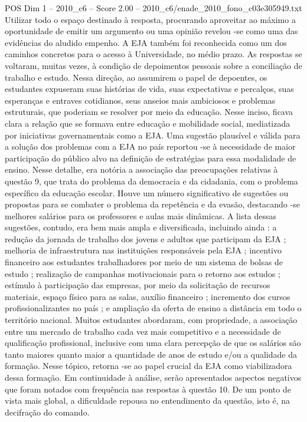 \begin{textsample}{POS Dim 1 – 2010\_c6 – Score 2.00 – 2010\_c6/enade\_2010\_fono\_c03e305949.txt}
Utilizar todo o espaço destinado à resposta, procurando aproveitar ao máximo a oportunidade de emitir um argumento ou uma opinião revelou -se como uma das evidências do aludido empenho.
A EJA também foi reconhecida como um dos caminhos concretos para o acesso à Universidade, no médio prazo.
As respostas se voltaram, muitas vezes, à condição de depoimentos pessoais sobre a conciliação de trabalho e estudo.
Nessa direção, ao assumirem o papel de depoentes, os estudantes expuseram suas histórias de vida, suas expectativas e percalços, suas esperanças e entraves cotidianos, seus anseios mais ambiciosos e problemas estruturais, que poderiam se resolver por meio da educação.
Nesse inciso, ficava clara a relação que se formava entre educação e mobilidade social, mediatizada por iniciativas governamentais como a EJA.
Uma sugestão plausível e válida para a solução dos problemas com a EJA no país reportou -se à necessidade de maior participação do público alvo na definição de estratégias para essa modalidade de ensino.
Nesse detalhe, era notória a associação das preocupações relativas à questão 9, que trata do problema da democracia e da cidadania, com o problema específico da educação escolar.
Houve um número significativo de sugestões ou propostas para se combater o problema da repetência e da evasão, destacando -se melhores salários para os professores e aulas mais dinâmicas.
A lista dessas sugestões, contudo, era bem mais ampla e diversificada, incluindo ainda : a redução da jornada de trabalho dos jovens e adultos que participam da EJA ; melhoria de infraestrutura nas instituições responsáveis pela EJA ; incentivo financeiro aos estudantes trabalhadores por meio de um sistema de bolsas de estudo ; realização de campanhas motivacionais para o retorno aos estudos ; estímulo à participação das empresas, por meio da solicitação de recursos materiais, espaço físico para as salas, auxílio financeiro ; incremento dos cursos profissionalizantes no país ; e ampliação da oferta de ensino a distância em todo o território nacional.
Muitos estudantes abordaram, com propriedade, a associação entre um mercado de trabalho cada vez mais competitivo e a necessidade de qualificação profissional, inclusive com uma clara percepção de que os salários são tanto maiores quanto maior a quantidade de anos de estudo e/ou a qualidade da formação.
Nesse tópico, retorna -se ao papel crucial da EJA como viabilizadora dessa formação.
Em continuidade à análise, serão apresentados aspectos negativos que foram notados com frequência nas respostas à questão 10.
De um ponto de vista mais global, a dificuldade repousa no entendimento da questão, isto é, na decifração do comando.

\end{textsample}
